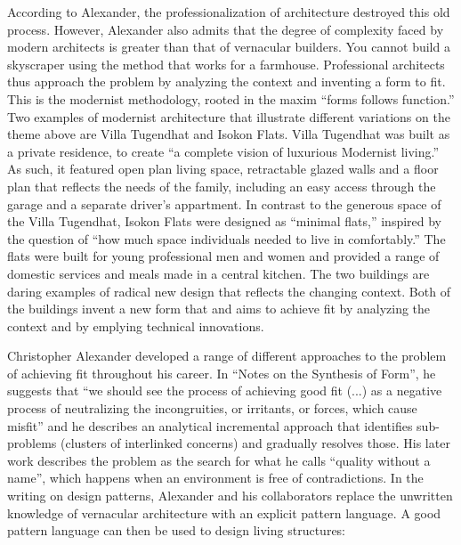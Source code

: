 According to Alexander, the professionalization of architecture destroyed this old process.
However, Alexander also admits that the degree of complexity faced by modern architects is
greater than that of vernacular builders. You cannot build a skyscraper using the method that
works for a farmhouse. Professional architects thus approach the problem by analyzing the context
and inventing a form to fit. This is the modernist methodology, rooted in the maxim ``forms follows
function.'' Two examples of modernist architecture that illustrate different
variations on the theme above are Villa Tugendhat and Isokon Flats. Villa Tugendhat was built as
a private residence, to create ``a complete vision of luxurious Modernist living.''
As such, it featured open plan living space, retractable glazed walls and a floor plan that
reflects the needs of the family, including an easy access through the garage and a separate
driver's appartment. In contrast to the generous space of the Villa Tugendhat, Isokon Flats were
designed as ``minimal flats,''
inspired by the question of ``how much space individuals needed to live in comfortably.''
The flats were built for young professional men and women and provided a range of domestic services
and meals made in a central kitchen. The two buildings are daring examples of radical new design
that reflects the changing context. Both of the buildings invent a new form that and aims to
achieve fit by analyzing the context and by emplying technical innovations.

Christopher Alexander developed a range of different approaches to the problem of achieving
fit throughout his career. In ``Notes on the Synthesis of Form'', he suggests that
``we should see the process of achieving good fit (...) as a negative process of neutralizing
the incongruities, or irritants, or forces, which cause misfit'' and
he describes an analytical incremental approach that identifies sub-problems (clusters of
interlinked concerns) and gradually resolves those. His later work describes the problem as the
search for what he calls ``quality without a name'', which happens when an environment is
free of contradictions. In the writing on design patterns, Alexander and his collaborators
replace the unwritten knowledge of vernacular architecture with an explicit pattern language.
A good pattern language can then be used to design living structures:


